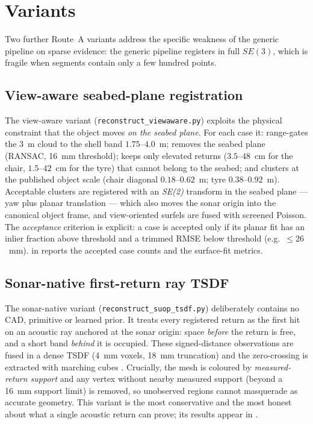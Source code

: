 \section{Variants}
\label{sec:routea_variants}

Two further Route~A variants address the specific weakness of the generic
pipeline on sparse \suop{} evidence: the generic pipeline registers in full
$SE(3)$, which is fragile when segments contain only a few hundred points.

\subsection{View-aware seabed-plane registration}
The view-aware variant (\texttt{reconstruct\_viewaware.py}) exploits the
physical constraint that the object moves \emph{on the seabed plane}. For each
case it: range-gates the 3~m cloud to the shell band $1.75$--$4.0$~m; removes
the seabed plane (RANSAC, 16~mm threshold); keeps only elevated returns
($3.5$--$48$~cm for the chair, $1.5$--$42$~cm for the tyre) that cannot belong
to the seabed; and clusters at the published object scale (chair diagonal
$0.18$--$0.62$~m; tyre $0.38$--$0.92$~m). Acceptable clusters are registered
with an \emph{SE(2)} transform in the seabed plane --- yaw plus planar
translation --- which also moves the sonar origin into the canonical object
frame, and view-oriented surfels are fused with screened Poisson. The
\emph{acceptance} criterion is explicit: a case is accepted only if its planar
fit has an inlier fraction above threshold and a trimmed RMSE below threshold
(e.g.\ $\le 26$~mm).  in  reports
the accepted case counts and the surface-fit metrics.

\subsection{Sonar-native first-return ray TSDF}
\label{sec:routea_tsdf}
The sonar-native variant (\texttt{reconstruct\_suop\_tsdf.py}) deliberately
contains no CAD, primitive or learned prior. It treats every registered return
as the first hit on an acoustic ray anchored at the sonar origin: space
\emph{before} the return is free, and a short band \emph{behind} it is
occupied. These signed-distance observations are fused in a dense TSDF
\citep{curless1996volumetric} (4~mm voxels, 18~mm truncation) and the
zero-crossing is extracted with marching cubes \citep{lorensen1987marching}.
Crucially, the mesh is coloured by \emph{measured-return support} and any
vertex without nearby measured support (beyond a 16~mm support limit) is
removed, so unobserved regions cannot masquerade as accurate geometry. This
variant is the most conservative and the most honest about what a single
acoustic return can prove; its results appear in .

